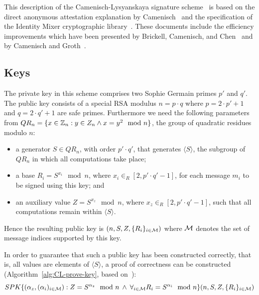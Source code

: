 This description of the Camenisch-Lysyanskaya signature
scheme~\cite{CamenischLysyanskaya2003,Lysyanskaya2002} is based on the
direct anonymous attestation explanation by Camenisch~\cite{Camenisch2007} and
the specification of the Identity Mixer cryptographic
library~\cite{IdemixCrypto2012}. These documents include the efficiency
improvements which have been presented by Brickell, Camenisch, and
Chen~\cite{BrickellCC2004} and by Camenisch and Groth~\cite{CamenischGroth2004}.

\subsection{Keys}\label{sec:cl_keys}

The private key in this scheme comprises two Sophie Germain primes $p'$ and $q'$.
The public key  consists of a special RSA modulus $n = p \cdot q$ where
$p = 2 \cdot p' + 1$ and $q = 2 \cdot q' + 1$ are safe primes. Furthermore we
need the following parameters from
$QR_n = \{ x \in \mathbb{Z}_n: y \in Z_n \land x = y^2 \mod n \}$, the group of
quadratic residues modulo $n$:
\begin{itemize}
  \item a generator $S \in QR_n$, with order $p' \cdot q'$, that generates
    $\langle S \rangle$, the subgroup of $QR_n$ in which all computations take
    place;
  \item a base $R_i = S^{x_i} \mod n$, where $x_i \in_R [2, p' \cdot q' - 1]$,
    for each message $m_i$ to be signed using this key; and
  \item an auxiliary value $Z = S^{x_z} \mod n$, where
    $x_z \in_R [2, p' \cdot q' - 1]$, such that all computations remain within
    $\langle S \rangle$.
\end{itemize}
Hence the resulting public key is $(n, S, Z, \{R_i\}_{i \in \mathcal{M}})$ where $\mathcal{M}$
denotes the set of message indices supported by this key.

In order to guarantee that such a public key has been constructed correctly,
that is, all values are elements of $\langle S \rangle$, a proof of
correctness can be constructed (Algorithm~\ref{alg:CL-prove-key}, based
on~\cite[Appendix A]{BrickellCC2004}):
\begin{equation*}
  SPK \{ (\alpha_z, (\alpha_i)_{i \in \mathcal{M}}) : Z = S^{\alpha_z} \mod n
    \:\land\: \forall_{i \in \mathcal{M}} R_i = S^{\alpha_i} \mod n
  \}(n, S, Z, \{R_i\}_{i \in \mathcal{M}})
\end{equation*}

